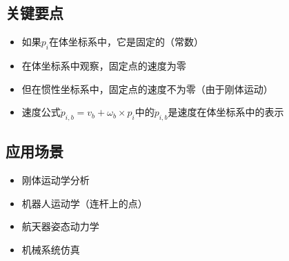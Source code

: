 \documentclass[12pt,a4paper]{article}
\begin{document}
\subsection{关键要点}

\begin{itemize}
\item 如果$p_i$在体坐标系中，它是固定的（常数）
\item 在体坐标系中观察，固定点的速度为零
\item 但在惯性坐标系中，固定点的速度不为零（由于刚体运动）
\item 速度公式$\dot{p}_{i,b} = v_b + \omega_b \times p_i$中的$\dot{p}_{i,b}$是速度在体坐标系中的表示
\end{itemize}

\subsection{应用场景}

\begin{itemize}
\item 刚体运动学分析
\item 机器人运动学（连杆上的点）
\item 航天器姿态动力学
\item 机械系统仿真
\end{itemize}
\end{document}
